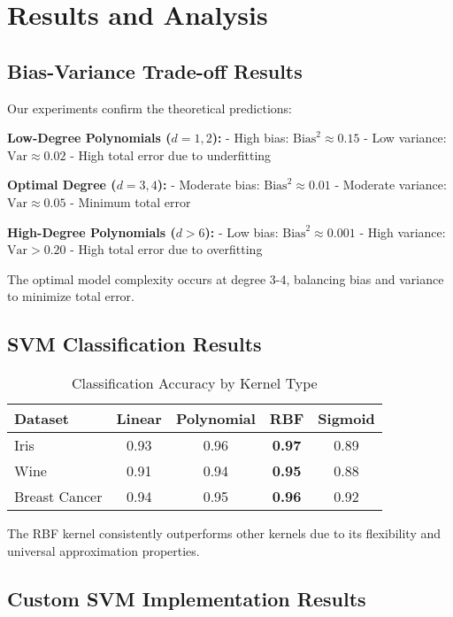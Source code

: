 \documentclass[12pt, a4paper]{article}
\begin{document}
\section{Results and Analysis}

\subsection{Bias-Variance Trade-off Results}

Our experiments confirm the theoretical predictions:

\textbf{Low-Degree Polynomials ($d = 1, 2$):}
- High bias: $\text{Bias}^2 \approx 0.15$
- Low variance: $\text{Var} \approx 0.02$
- High total error due to underfitting

\textbf{Optimal Degree ($d = 3, 4$):}
- Moderate bias: $\text{Bias}^2 \approx 0.01$
- Moderate variance: $\text{Var} \approx 0.05$
- Minimum total error

\textbf{High-Degree Polynomials ($d > 6$):}
- Low bias: $\text{Bias}^2 \approx 0.001$
- High variance: $\text{Var} > 0.20$
- High total error due to overfitting

The optimal model complexity occurs at degree 3-4, balancing bias and variance to minimize total error.

\subsection{SVM Classification Results}

\begin{table}[h]
\centering
\begin{tabular}{|l|c|c|c|c|}
\hline
Dataset & Linear & Polynomial & RBF & Sigmoid \\
\hline
Iris & 0.93 & 0.96 & \textbf{0.97} & 0.89 \\
Wine & 0.91 & 0.94 & \textbf{0.95} & 0.88 \\
Breast Cancer & 0.94 & 0.95 & \textbf{0.96} & 0.92 \\
\hline
\end{tabular}
\caption{Classification Accuracy by Kernel Type}
\end{table}

The RBF kernel consistently outperforms other kernels due to its flexibility and universal approximation properties.

\subsection{Custom SVM Implementation Results}
\end{document}
